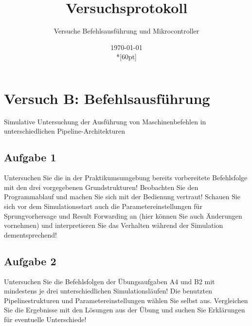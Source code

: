 \documentclass[a4paper,12pt,titlepage]{scrartcl}
\begin{document}
\titlehead
{
    \small
    {
        Technische Universität Ilmenau\\
        Fakulät IA\\
        Fachgebiet Rechnerarchitektur\\

        Praktikum Rechnerarchitektur 2\\
        WS 2021/22}
}

\title {Versuchsprotokoll}
\subtitle{Versuche Befehlsausführung und Mikrocontroller}
\author{}
\date{\today\\*[60pt]}
\maketitle  %

\pagestyle{fancy}
\newpage

\section*{Versuch B: Befehlsausführung}
Simulative Untersuchung der Ausführung von Maschinenbefehlen in unterschiedlichen Pipeline-Architekturen

\subsection*{Aufgabe 1}
Untersuchen Sie die in der Praktikumsumgebung bereits vorbereitete Befehlsfolge mit den drei vorgegebenen Grundstrukturen! Beobachten Sie den Programmablauf und machen Sie sich mit der Bedienung vertraut! Schauen Sie sich vor dem Simulationsstart auch die Parametereinstellungen für Sprungvorhersage und Result Forwarding an (hier können Sie auch Änderungen vornehmen) und interpretieren Sie das Verhalten während der Simulation dementsprechend!

\subsection*{Aufgabe 2}
Untersuchen Sie die Befehlsfolgen der Übungsaufgaben A4 und B2 mit mindestens je drei unterschiedlichen Simulationsläufen! Die benutzten Pipelinestrukturen und Parametereinstellungen wählen Sie selbst aus. Vergleichen Sie die Ergebnisse mit den Lösungen aus der Übung und suchen Sie Erklärungen für eventuelle Unterschiede!
\end{document}
